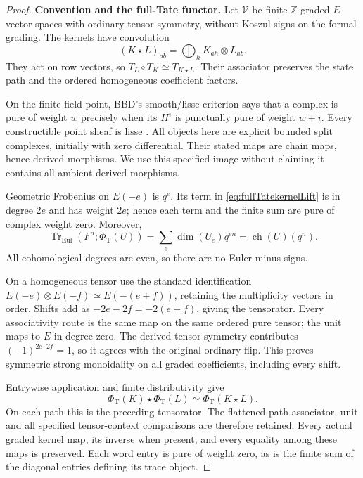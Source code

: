 \begin{proof}
\par\smallskip\noindent\textbf{Convention and the full-Tate functor.}\quad
Let \(\mathcal V\) be finite \(\mathbb Z\)-graded \(E\)-vector
spaces with ordinary tensor symmetry, without Koszul signs on
the formal grading. The kernels have convolution
\[
 (K\star L)_{ab}=\bigoplus_h K_{ah}\otimes L_{hb}.
\]
They act on row vectors, so \(T_L\circ T_K\simeq T_{K\star L}\).
Their associator preserves the state path and the ordered
homogeneous coefficient factors.

On the finite-field point, BBD's smooth/lisse criterion says
that a complex is pure of weight \(w\) precisely when its
\(H^i\) is punctually pure of weight \(w+i\).
Every constructible point sheaf is lisse
\cite[5.1.5, pp.~125--126; 5.1.8, pp.~126--127]{BBD}.
All objects here are explicit bounded split complexes,
initially with zero differential. Their stated maps are
chain maps, hence derived morphisms. We use this specified
image without claiming it contains all ambient derived
morphisms.

Geometric Frobenius on \(E(-e)\) is \(q^e\).
Its term in \eqref{eq:fullTatekernelLift} is in degree \(2e\)
and has weight \(2e\); hence each term and the finite sum are
pure of complex weight zero. Moreover,
\begin{equation}\label{eq:fullTatekernelTrace}
 \operatorname{Tr}_{\mathrm{Eul}}(F^n;\Phi_{\mathrm T}(U))
   =\sum_e\dim(U_e)q^{en}
   =\operatorname{ch}(U)(q^n).
\end{equation}
All cohomological degrees are even, so there are no Euler
minus signs.

On a homogeneous tensor use the standard identification
\(E(-e)\otimes E(-f)\simeq E(-(e+f))\), retaining the
multiplicity vectors in order. Shifts add as
\(-2e-2f=-2(e+f)\), giving the tensorator.
Every associativity route is the same map on the same
ordered pure tensor; the unit maps to \(E\) in degree zero.
The derived tensor symmetry contributes
\((-1)^{2e\cdot2f}=1\), so it agrees with the original
ordinary flip. This proves symmetric strong monoidality
on all graded coefficients, including every shift.

Entrywise application and finite distributivity give
\[
 \Phi_{\mathrm T}(K)\star\Phi_{\mathrm T}(L)
       \simeq\Phi_{\mathrm T}(K\star L).
\]
On each path this is the preceding tensorator.
The flattened-path associator, unit and all specified
tensor-context comparisons are therefore retained.
Every actual graded kernel map, its inverse when present,
and every equality among these maps is preserved.
Each word entry is pure of weight zero, as is the finite
sum of the diagonal entries defining its trace object.


\end{proof}
